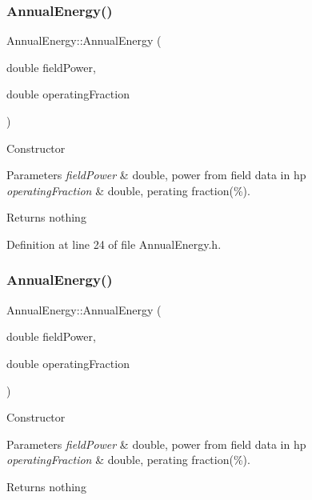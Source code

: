 \subsubsection{\texorpdfstring{Annual\+Energy()}{AnnualEnergy()}\hspace{0.1cm}{\footnotesize\ttfamily [2/3]}}
{\footnotesize\ttfamily Annual\+Energy\+::\+Annual\+Energy (\begin{DoxyParamCaption}\item[{double}]{field\+Power,  }\item[{double}]{operating\+Fraction }\end{DoxyParamCaption})\hspace{0.3cm}{\ttfamily [inline]}}

Constructor 
\begin{DoxyParams}{Parameters}
{\em field\+Power} & double, power from field data in hp \\
\hline
{\em operating\+Fraction} & double, perating fraction(\%). \\
\hline
\end{DoxyParams}
\begin{DoxyReturn}{Returns}
nothing 
\end{DoxyReturn}


Definition at line 24 of file Annual\+Energy.\+h.

\mbox{\label{class_annual_energy_a5e446ce85879bafeac8fc992cb5b9ed7}} 
\subsubsection{\texorpdfstring{Annual\+Energy()}{AnnualEnergy()}\hspace{0.1cm}{\footnotesize\ttfamily [3/3]}}
{\footnotesize\ttfamily Annual\+Energy\+::\+Annual\+Energy (\begin{DoxyParamCaption}\item[{double}]{field\+Power,  }\item[{double}]{operating\+Fraction }\end{DoxyParamCaption})\hspace{0.3cm}{\ttfamily [inline]}}

Constructor 
\begin{DoxyParams}{Parameters}
{\em field\+Power} & double, power from field data in hp \\
\hline
{\em operating\+Fraction} & double, perating fraction(\%). \\
\hline
\end{DoxyParams}
\begin{DoxyReturn}{Returns}
nothing 
\end{DoxyReturn}


